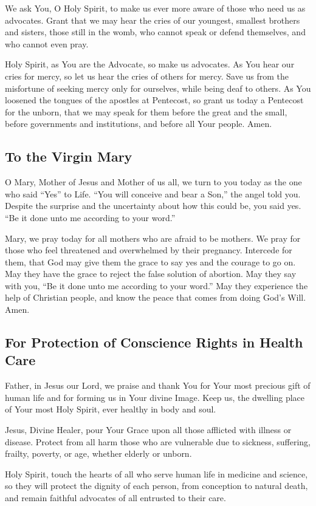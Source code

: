 \documentclass[12pt]{article}
\newcommand{\prayertitle}[1]{\subsection{#1}}
\begin{document}
We ask You, O Holy Spirit, to make us ever more aware of those who need us as advocates.
Grant that we may hear the cries of our youngest, smallest brothers and sisters, those still in the womb, who cannot speak or defend themselves, and who cannot even pray.

Holy Spirit, as You are the Advocate, so make us advocates.
As You hear our cries for mercy, so let us hear the cries of others for mercy.
Save us from the misfortune of seeking mercy only for ourselves, while being deaf to others.
As You loosened the tongues of the apostles at Pentecost, so grant us today a Pentecost for the unborn, that we may speak for them before the great and the small, before governments and institutions, and before all Your people.
Amen.

\prayertitle{To the Virgin Mary}
O Mary, Mother of Jesus and Mother of us all, we turn to you today as the one who said ``Yes'' to Life.
``You will conceive and bear a Son,'' the angel told you.
Despite the surprise and the uncertainty about how this could be, you said yes.
``Be it done unto me according to your word.''

Mary, we pray today for all mothers who are afraid to be mothers.
We pray for those who feel threatened and overwhelmed by their pregnancy.
Intercede for them, that God may give them the grace to say yes and the courage to go on.
May they have the grace to reject the false solution of abortion.
May they say with you, ``Be it done unto me according to your word.''
May they experience the help of Christian people, and know the peace that comes from doing God's Will.
Amen.

\prayertitle{For Protection of Conscience Rights in Health Care}
Father, in Jesus our Lord, we praise and thank You for Your most precious gift of human life and for forming us in Your divine Image.
Keep us, the dwelling place of Your most Holy Spirit, ever healthy in body and soul.

Jesus, Divine Healer, pour Your Grace upon all those afflicted with illness or disease.
Protect from all harm those who are vulnerable due to sickness, suffering, frailty, poverty, or age, whether elderly or unborn.

Holy Spirit, touch the hearts of all who serve human life in medicine and science, so they will protect the dignity of each person, from conception to natural death, and remain faithful advocates of all entrusted to their care.  
\end{document}
